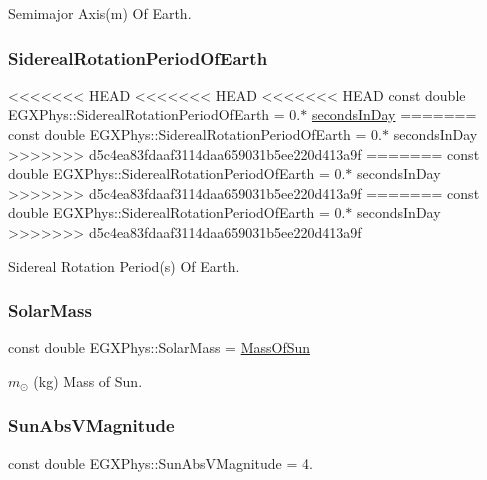 Semimajor Axis(m) Of Earth. \mbox{\label{namespace_e_g_x_phys_a34a388ac3f9196bb3cdbdbee5ff3cdb7}} 
\subsubsection{\texorpdfstring{Sidereal\+Rotation\+Period\+Of\+Earth}{SiderealRotationPeriodOfEarth}}
<<<<<<< HEAD
<<<<<<< HEAD
<<<<<<< HEAD
{\footnotesize\ttfamily const double E\+G\+X\+Phys\+::\+Sidereal\+Rotation\+Period\+Of\+Earth = 0.$\ast$ \hyperlink{namespace_e_g_x_phys_ab4f86327f64403b843077ecc189ce52b}{seconds\+In\+Day}}
=======
{\footnotesize\ttfamily const double E\+G\+X\+Phys\+::\+Sidereal\+Rotation\+Period\+Of\+Earth = 0.$\ast$ seconds\+In\+Day}
>>>>>>> d5c4ea83fdaaf3114daa659031b5ee220d413a9f
=======
{\footnotesize\ttfamily const double E\+G\+X\+Phys\+::\+Sidereal\+Rotation\+Period\+Of\+Earth = 0.$\ast$ seconds\+In\+Day}
>>>>>>> d5c4ea83fdaaf3114daa659031b5ee220d413a9f
=======
{\footnotesize\ttfamily const double E\+G\+X\+Phys\+::\+Sidereal\+Rotation\+Period\+Of\+Earth = 0.$\ast$ seconds\+In\+Day}
>>>>>>> d5c4ea83fdaaf3114daa659031b5ee220d413a9f

Sidereal Rotation Period(s) Of Earth. \mbox{\label{namespace_e_g_x_phys_aa8636def23e66bc4ad32394a088b3950}} 
\subsubsection{\texorpdfstring{Solar\+Mass}{SolarMass}}
{\footnotesize\ttfamily const double E\+G\+X\+Phys\+::\+Solar\+Mass = \hyperlink{namespace_e_g_x_phys_a6e84ae13f1dbcecb215af787bbc12cd6}{Mass\+Of\+Sun}}

$m_\odot$ (kg) Mass of Sun. \mbox{\label{namespace_e_g_x_phys_a61266dc1aaacdd9a9bd0f2fa92aa21c9}} 
\subsubsection{\texorpdfstring{Sun\+Abs\+V\+Magnitude}{SunAbsVMagnitude}}
{\footnotesize\ttfamily const double E\+G\+X\+Phys\+::\+Sun\+Abs\+V\+Magnitude = 4.}


